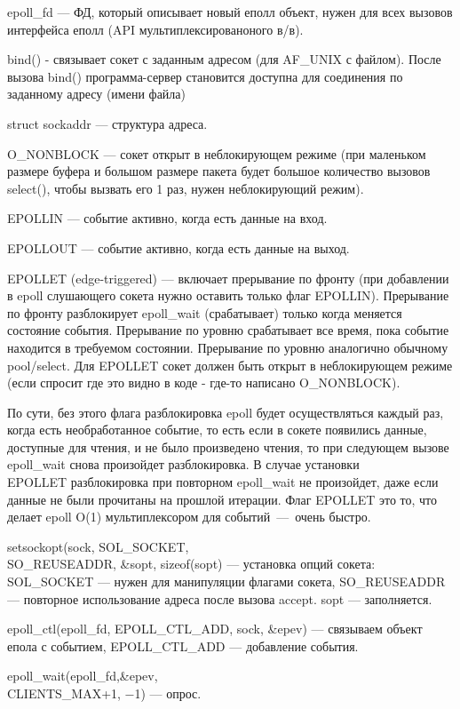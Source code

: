epoll\_fd --- ФД, который описывает новый еполл объект, нужен для всех вызовов интерфейса еполл (API мультиплексированоного в/в).

bind() - связывает сокет с заданным адресом (для AF\_UNIX с файлом). После вызова bind() программа-сервер становится доступна для соединения по заданному адресу (имени файла)

struct sockaddr --- структура адреса.

O\_NONBLOCK --- сокет открыт в неблокирующем режиме (при маленьком размере буфера и большом размере пакета будет большое количество вызовов select(), чтобы вызвать его 1 раз, нужен неблокирующий режим).

EPOLLIN — событие активно, когда есть данные на вход. 

EPOLLOUT — событие активно, когда есть данные на выход. 

EPOLLET (edge-triggered) — включает прерывание по фронту (при добавлении в epoll слушающего сокета нужно оставить только флаг EPOLLIN). Прерывание по фронту разблокирует epoll\_wait (срабатывает) только когда меняется состояние события. Прерывание по уровню срабатывает все время, пока событие находится в требуемом состоянии. Прерывание по уровню аналогично обычному pool/select. Для EPOLLET сокет должен быть открыт в неблокирующем режиме (если спросит где это видно в коде - где-то написано O\_NONBLOCK). 

По сути, без этого флага разблокировка epoll будет осуществляться каждый раз, когда есть необработанное событие, то есть если в сокете появились данные, доступные для чтения, и не было произведено чтения, то при следующем вызове epoll\_wait снова произойдет разблокировка. В случае установки \\ EPOLLET разблокировка при повторном epoll\_wait не произойдет, даже если данные не были прочитаны на прошлой итерации. Флаг EPOLLET это то, что делает epoll O(1) мультиплексором для событий~---~очень быстро.

setsockopt(sock, SOL\_SOCKET, \\ SO\_REUSEADDR, \&sopt, sizeof(sopt) --- установка опций сокета: SOL\_SOCKET --- нужен для манипуляции флагами сокета, SO\_REUSEADDR --- повторное использование адреса после вызова accept. sopt --- заполняется.

epoll\_ctl(epoll\_fd, EPOLL\_CTL\_ADD, sock, \&epev) --- связываем объект епола с событием, EPOLL\_CTL\_ADD --- добавление события.

epoll\_wait(epoll\_fd,\&epev, \\ CLIENTS\_MAX+1, −1) --- опрос.

